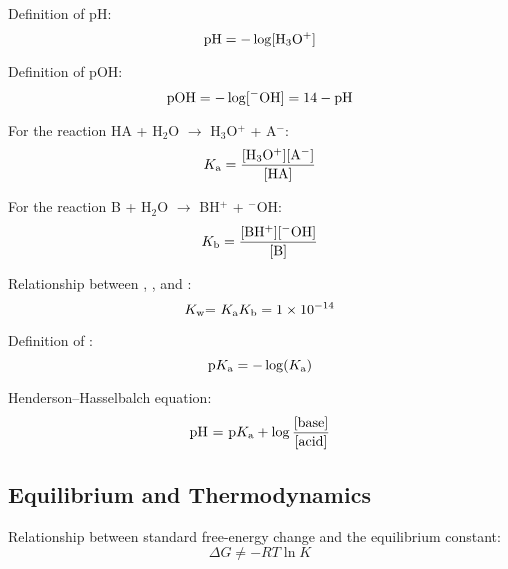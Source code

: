 \documentclass[10pt]{article}
\begin{document}
Definition of pH:
\begin{equation*}
\textnormal{pH} = -\log[\textnormal{H$_3$O$^{+}$}]
\end{equation*}

Definition of pOH:
\begin{equation*}
\textnormal{pOH} = -\log[\textnormal{$^{-}$OH}] = 14-\textnormal{pH}
\end{equation*}

For the reaction HA + H$_2$O $\longrightarrow$ H$_3$O$^{+}$ + A$^{-}$:
\begin{equation*}
\textnormal{$K_{\textnormal{a}}$} = \frac{[\textnormal{H$_3$O$^{+}$}][\textnormal{A$^{-}$}]}{[\textnormal{HA}]}
\end{equation*}

For the reaction B + H$_2$O $\longrightarrow$ BH$^{+}$ + $^{-}$OH:
\begin{equation*}
\textnormal{$K_{\textnormal{b}}$} = \frac{\textnormal{[BH$^{+}$][$^{-}$OH]}}{\textnormal{[B]}}
\end{equation*}

Relationship between \Ka, \Kb, and \Kw:
\begin{equation*}
\textnormal{$K_{\textnormal{w}}$= $K_{\textnormal{a}}$$K_{\textnormal{b}}$} = \num{1e-14}
\end{equation*}

Definition of \pKa:
\begin{equation*}
\textnormal{p$K_{\textnormal{a}}$} = -\log(\textnormal{$K_{\textnormal{a}}$})
\end{equation*}

Henderson--Hasselbalch equation:
\begin{equation*}
\textnormal{pH = p$K_{\textnormal{a}}$} + \log \frac{\textnormal{[base]}}{\textnormal{[acid]}}
\end{equation*}


\subsection{Equilibrium and Thermodynamics}

Relationship between standard free-energy change and the equilibrium constant:
\begin{equation*}
\Delta G\not = -RT \ln K
\end{equation*}
\end{document}
